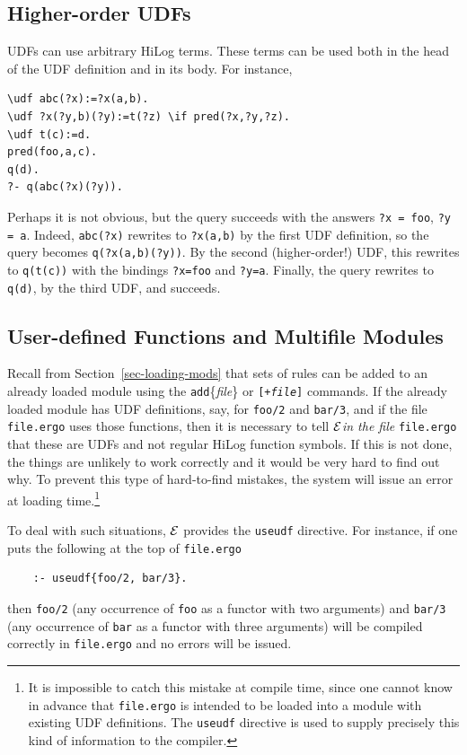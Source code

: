 \documentclass[11pt]{article}
\newcommand{\ERGO}{\mbox{\ensuremath{\cal{E}}\smaller{{\sc{RGO}}}}\xspace}
\newcommand{\FLSYSTEM}{\ERGO}
\newcommand{\ergoext}{ergo\xspace}
\begin{document}
\subsection{Higher-order UDFs}

UDFs can use arbitrary HiLog terms. These terms can be used both in the
head of the UDF definition and in its body. For instance,
\begin{verbatim}
\udf abc(?x):=?x(a,b).
\udf ?x(?y,b)(?y):=t(?z) \if pred(?x,?y,?z).
\udf t(c):=d.
pred(foo,a,c).
q(d).
?- q(abc(?x)(?y)).
\end{verbatim}
Perhaps it is not obvious, but the query succeeds
with the answers \texttt{?x = foo}, \texttt{?y = a}.    
Indeed, \texttt{abc(?x)} rewrites to \texttt{?x(a,b)}
by the first UDF definition, so the query becomes
\texttt{q(?x(a,b)(?y))}. By the second (higher-order!) UDF, this rewrites to
\texttt{q(t(c))} with the bindings \texttt{?x=foo} and \texttt{?y=a}.
Finally, the query rewrites to \texttt{q(d)}, by the third UDF, and succeeds. 

\subsection{User-defined Functions and Multifile Modules}
\label{sec-udf-multifile}

Recall from Section~\ref{sec-loading-mods} that sets of rules can be added to 
an already loaded module using the \texttt{add}\{\emph{file}\}
or \texttt{[+\textnormal{\emph{file}}]}
commands.  
If the already loaded module has UDF definitions, say, for \texttt{foo/2}
and \texttt{bar/3}, and if 
the file \texttt{file.\ergoext} uses those functions, then it is necessary to
tell \FLSYSTEM \emph{in the file}   \texttt{file.\ergoext} that these are UDFs and not regular HiLog
function symbols. If this is not done, the things are unlikely to work
correctly and it would be very hard to find out why.
To prevent this type of hard-to-find mistakes, the system
will issue an error at loading time.\footnote{
  It is impossible to catch this mistake at compile time, since one
  cannot know in advance that \texttt{file.\ergoext} is intended to
  be loaded into a module with existing UDF definitions.
  The \texttt{useudf} directive is used to supply precisely this kind
  of information to the compiler.
  }

To deal with such situations, \FLSYSTEM provides the \texttt{useudf}
directive. For instance, if one puts the following at the top of
\texttt{file.\ergoext}
\begin{verbatim}
    :- useudf{foo/2, bar/3}.
\end{verbatim}
then \texttt{foo/2} (any occurrence of \texttt{foo} as  a functor with two
arguments)  and \texttt{bar/3} (any occurrence of \texttt{bar} as a functor
with three arguments)
will be compiled correctly in \texttt{file.\ergoext} and
no errors will be issued.
\end{document}
